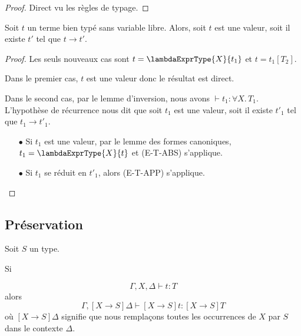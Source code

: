 \begin{proof}
  Direct vu les règles de typage.
\end{proof}

\begin{theorem} [de progression]
  Soit $t$ un terme bien typé sans variable libre. Alors, soit $t$ est une
  valeur, soit il existe $t'$ tel que $t \rightarrow t'$.
\end{theorem}

\begin{proof}
  Les seuls nouveaux cas sont $t = \lambdaExprType{X}{t_{1}}$ et $t =
  t_{1}[T_{2}]$.

  Dans le premier cas, $t$ est une valeur donc le résultat est direct.

  Dans le second cas, par le lemme d'inversion, nous avons $\vdash t_{1} :
  \forall X . \, T_{1}$. L'hypothèse de récurrence nous dit que soit $t_{1}$ est
  une valeur, soit il existe $t'_{1}$ tel que $t_{1} \rightarrow t'_{1}$.

  \begin{itemize}
  \item[$\bullet$] Si $t_{1}$ est une valeur, par le lemme des formes canoniques, $t_{1} =
    \lambdaExprType{X}{t}$ et (E-T-ABS) s'applique.
  \item[$\bullet$] Si $t_{1}$ se réduit en $t'_{1}$, alors (E-T-APP) s'applique.
  \end{itemize}
\end{proof}

\subsection*{Préservation}

%
%
%
%  

\begin{lemma} 
  \label{thm:system-f-preservation-substitution-type}
  Soit $S$ un type.

  Si

  \begin{equation*}
    \Gamma, X, \Delta \vdash t : T
  \end{equation*}
  alors
  \begin{equation*}
    \Gamma, [X \rightarrow S]\Delta \vdash [X \rightarrow S]t : [X \rightarrow S] T 
  \end{equation*}
  où $[X \rightarrow S]\Delta$ signifie que nous remplaçons toutes les
  occurrences de $X$ par $S$ dans le contexte $\Delta$.
\end{lemma}

